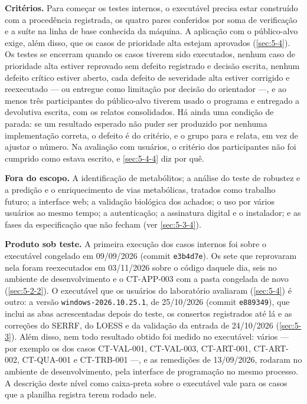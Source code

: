 \textbf{Critérios.} Para começar os testes internos, o executável precisa estar construído com a procedência registrada, os quatro pares conferidos por soma de verificação e a suíte na linha de base conhecida da máquina. A aplicação com o público-alvo exige, além disso, que os casos de prioridade alta estejam aprovados (\ref{sec:5-4}). Os testes se encerram quando os casos tiverem sido executados, nenhum caso de prioridade alta estiver reprovado sem defeito registrado e decisão escrita, nenhum defeito crítico estiver aberto, cada defeito de severidade alta estiver corrigido e reexecutado --- ou entregue como limitação por decisão do orientador ---, e ao menos três participantes do público-alvo tiverem usado o programa e entregado a devolutiva escrita, com os relatos consolidados. Há ainda uma condição de parada: se um resultado esperado não puder ser produzido por nenhuma implementação correta, o defeito é do critério, e o grupo para e relata, em vez de ajustar o número. Na avaliação com usuários, o critério dos participantes não foi cumprido como estava escrito, e \ref{sec:5-4-4} diz por quê.


\textbf{Fora do escopo.} A identificação de metabólitos; a análise do teste de robustez e a predição e o enriquecimento de vias metabólicas, tratados como trabalho futuro; a interface web; a validação biológica dos achados; o uso por vários usuários ao mesmo tempo; a autenticação; a assinatura digital e o instalador; e as fases da especificação que não fecham (ver \ref{sec:5-3-4}).

\textbf{Produto sob teste.} A primeira execução dos casos internos foi sobre o executável congelado em 09/09/2026 (commit \texttt{e3b4d7e}). Os sete que reprovaram nela foram reexecutados em 03/11/2026 sobre o código daquele dia, seis no ambiente de desenvolvimento e o CT-APP-003 com a pasta congelada de novo (\ref{sec:5-2-2}). O executável que os usuários do laboratório avaliaram (\ref{sec:5-4}) é outro: a versão \texttt{windows-\allowbreak{}2026.\allowbreak{}10.\allowbreak{}25.\allowbreak{}1}, de 25/10/2026 (commit \texttt{e889349}), que inclui as abas acrescentadas depois do teste, os consertos registrados até lá e as correções do SERRF, do LOESS e da validação da entrada de 24/10/2026 (\ref{sec:5-3}). Além disso, nem todo resultado obtido foi medido no executável: vários --- por exemplo os dos casos CT-VAL-001, CT-VAL-003, CT-ART-001, CT-ART-002, CT-QUA-001 e CT-TRB-001 ---, e as remedições de 13/09/2026, rodaram no ambiente de desenvolvimento, pela interface de programação no mesmo processo. A descrição deste nível como caixa-preta sobre o executável vale para os casos que a planilha registra terem rodado nele.

